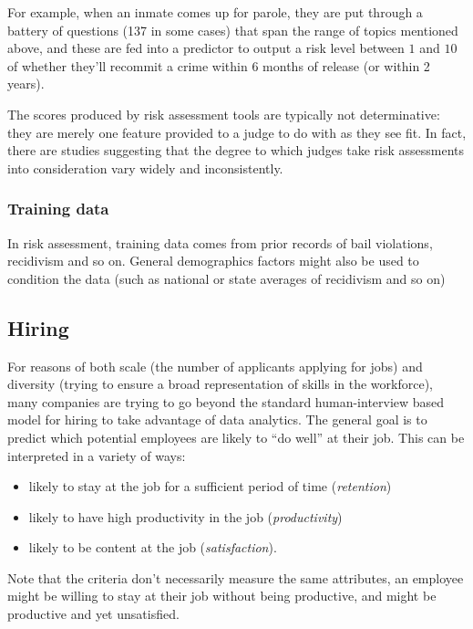 \documentclass[11pt]{paper}
\begin{document}
For example, when an inmate comes up for parole, they are put through a
battery of questions (137 in some cases) that span the range of topics
mentioned above, and these are fed into a predictor to output a risk
level between $1$ and $10$ of whether they'll recommit a crime within 6
months of release (or within 2 years). \citep{angwin_machine_2016}

The scores produced by risk assessment tools are typically not
determinative: they are merely one feature provided to a judge to do
with as they see fit. In fact, there are studies suggesting that the
degree to which judges take risk assessments into consideration vary
widely and inconsistently.

\subsubsection{Training data}\label{training-data-1}

In risk assessment, training data comes from prior records of bail
violations, recidivism and so on. General demographics factors might
also be used to condition the data (such as national or state averages
of recidivism and so on)

\subsection{Hiring}\label{hiring}

For reasons of both scale (the number of applicants applying for jobs)
and diversity (trying to ensure a broad representation of skills in the
workforce), many companies are trying to go beyond the standard
human-interview based model for hiring to take advantage of data
analytics. The general goal is to predict which potential employees are
likely to ``do well'' at their job. This can be interpreted in a variety
of ways:

\begin{itemize}
\itemsep1pt\parskip0pt
\item
  likely to stay at the job for a sufficient period of time
  (\emph{retention})
\item
  likely to have high productivity in the job (\emph{productivity})
\item
  likely to be content at the job (\emph{satisfaction}).
\end{itemize}

Note that the criteria don't necessarily measure the same attributes, an
employee might be willing to stay at their job without being productive,
and might be productive and yet unsatisfied.
\end{document}
